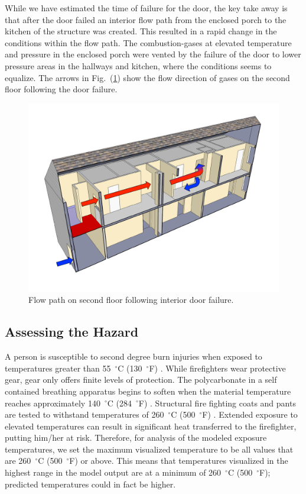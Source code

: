 \documentclass[11pt,oneside]{book}
\begin{document}
While we have estimated the time of failure for the door, the key take away is that after the door failed an interior flow path from the enclosed porch to the kitchen of the structure was created. This resulted in a rapid change in the conditions within the flow path. The combustion-gases at elevated temperature and pressure  in the enclosed porch were vented by the failure of the door to lower pressure areas in the hallways and kitchen, where the conditions seems to equalize. The arrows in Fig.~(\ref{fig:flowpath_1}) show the flow direction of gases on the second floor following the door failure.

\begin{figure}[h!]
\centering
\includegraphics[width=.7\textwidth]{../Figures/ChicagoFlow}
\caption{Flow path on second floor following interior door failure.}
\label{fig:flowpath_1}
\end{figure}

\subsection{Assessing the Hazard}

A person is susceptible to second degree burn injuries when exposed to temperatures greater than 55~$^{\circ}$C (130~$^{\circ}$F) \cite{designation2003c}. While firefighters wear protective gear, gear only offers finite levels of protection. The polycarbonate in a self contained breathing apparatus begins to soften when the material temperature reaches approximately 140~$^{\circ}$C (284~$^{\circ}$F) \cite{mensch2011emergency}. Structural fire fighting coats and pants are tested to withstand temperatures of 260~$^{\circ}$C (500~$^{\circ}$F) \cite{nfpa2013standard}. Extended exposure to elevated temperatures can result in significant heat transferred to the firefighter, putting him/her at risk. Therefore, for analysis of the modeled exposure temperatures, we set the maximum visualized temperature to be all values that are 260~$^{\circ}$C (500~$^{\circ}$F) or above. This means that temperatures visualized in the highest range in the model output are at a minimum of 260~$^{\circ}$C (500~$^{\circ}$F); predicted temperatures could in fact be higher.
\end{document}
